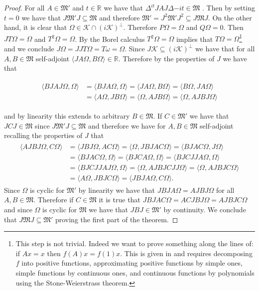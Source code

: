 \begin{proof}

For all $A\in\mathfrak{M}'$ and $t\in\mathbb{R}$ we have that $\Delta^{it}JAJ\Delta{-it}\in\mathfrak{M}$ \cite{Duvenhage1999}\cite{Rieffel1977}. Then by setting $t=0$ we have that $J\mathfrak{M}'J\subseteq \mathfrak{M}$ and therefore $\mathfrak{M}'=J^2\mathfrak{M}'J^2\subseteq J\mathfrak{M}J$. On the other hand, it is clear that $\Omega\in\mathcal{K}\cap (i\mathcal{K})^\bot$. Therefore $P\Omega=\Omega$ and $Q\Omega=0$. Then $JT\Omega=\Omega$ and $T^2\Omega=\Omega$. By the Borel calculus $T^2\Omega=\Omega$ implies that $T\Omega=\Omega$\footnote{This step is not trivial. Indeed we want to prove something along the lines of: if $Ax=x$ then $f(A)x=f(1)x$. This is given in \cite{Duvenhage1999} and requires decomposing $f$ into positive functions, approximating positive functions by simple ones, simple functions by continuous ones, and continuous functions by polynomials using the Stone-Weierstrass theorem.} and we conclude $J\Omega=JJT\Omega=T\omega=\Omega$. Since $J\mathcal{K}\subseteq(i\mathcal{K})^\bot$ we have that for all $A,B\in\mathfrak{M}$ self-adjoint $\langle JA\Omega,B\Omega\rangle\in\mathbb{R}$. Therefore by the properties of $J$ we have that 

\begin{align}
\begin{split}
\langle BJAJ\Omega,\Omega\rangle&=\langle BJA\Omega,\Omega\rangle=\langle JA\Omega,B\Omega\rangle =\langle B\Omega, JA\Omega\rangle \\
&=\langle A\Omega,JB\Omega\rangle=\langle \Omega, AJB\Omega\rangle=\langle \Omega,AJBJ\Omega\rangle
\end{split}
\end{align}   

and by linearity this extends to arbitrary $B\in\mathfrak{M}$. If $C\in\mathfrak{M}'$ we have that $JCJ\in\mathfrak{M}$ since $J\mathfrak{M}'J\subseteq\mathfrak{M}$ and therefore we have for $A,B\in\mathfrak{M}$ self-adjoint recalling the properties of $J$ that
\begin{align}
\begin{split}
\langle AJBJ\Omega, C\Omega\rangle&=\langle JBJ\Omega, AC\Omega\rangle = \langle \Omega, JBJAC\Omega\rangle = \langle BJAC\Omega, J\Omega\rangle \\
&=\langle BJAC\Omega, \Omega\rangle = \langle BJCA\Omega,\Omega\rangle = \langle BJCJJA\Omega,\Omega\rangle \\
&= \langle BJCJJAJ\Omega,\Omega\rangle = \langle\Omega, AJBJCJJ\Omega\rangle = \langle\Omega, AJBJC\Omega\rangle \\
&= \langle A\Omega,JBJC\Omega\rangle=\langle JBJA\Omega,C\Omega\rangle.
\end{split}
\end{align}
Since $\Omega$ is cyclic for $\mathfrak{M}'$ by linearity we have that $JBJA\Omega=AJBJ\Omega$ for all $A,B\in\mathfrak{M}$. Therefore if $C\in\mathfrak{M}$ it is true that $JBJAC\Omega=ACJBJ\Omega=AJBJC\Omega$ and since $\Omega$ is cyclic for $\mathfrak{M}$ we have that $JBJ\in\mathfrak{M}'$ by continuity. We conclude that $J\mathfrak{M}J\subseteq\mathfrak{M}'$ proving the first part of the theorem.


\end{proof}
